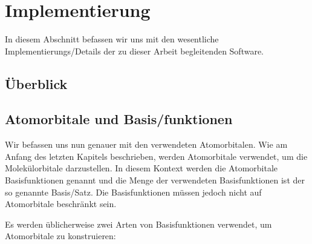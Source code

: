 \section{Implementierung}
In diesem Abschnitt befassen wir uns mit den wesentliche Implementierungs\-/Details
der zu dieser Arbeit begleitenden Software.

\subsection{Überblick}

\subsection{Atomorbitale und Basis\-/funktionen}\label{basis-functions-section}
Wir befassen uns nun genauer mit den verwendeten Atomorbitalen.
Wie am Anfang des letzten Kapitels beschrieben, werden Atomorbitale verwendet,
um die Molekülorbitale darzustellen. In diesem Kontext werden die Atomorbitale
Basisfunktionen genannt und die Menge der verwendeten Basisfunktionen
ist der so genannte Basis\-/Satz.
Die Basisfunktionen müssen jedoch nicht auf Atomorbitale beschränkt sein.
\cite[Ab. 5.3.1]{lewars_2016}

Es werden üblicherweise zwei Arten von Basisfunktionen verwendet,
um Atomorbitale zu konstruieren:

